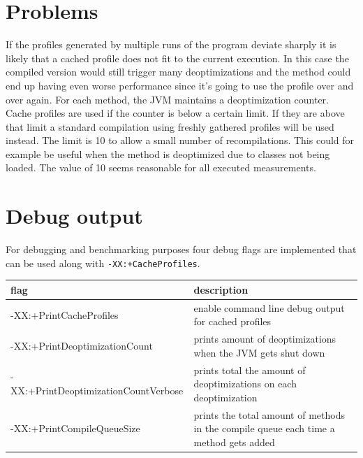 \section{Problems}
\label{s:problems}
If the profiles generated by multiple runs of the program deviate sharply it is likely that a cached profile does not fit to the current execution. In this case the compiled version would still trigger many deoptimizations and the method could end up having even worse performance since it's going to use the profile over and over again.
For each method, the JVM maintains a deoptimization counter. Cache profiles are used if the counter is below a certain limit. If they are above that limit a standard compilation using freshly gathered profiles will be used instead.
The limit is 10 to allow a small number of recompilations. This could for example be useful when the method is deoptimized due to classes not being loaded. The value of 10 seems reasonable for all executed measurements.
\section{Debug output}
\label{s:debugoutput}
For debugging and benchmarking purposes four debug flags are implemented that can be used along with \texttt{-XX:+CacheProfiles}.
\begin{table}[ht]
  \centering
  \label{t:debugflags}
  \begin{center}
    \begin{tabular}{| l | p{9.0cm} |}
       \hline
       \textbf{flag} & \textbf{description} \\ \hline\hline
       -XX:+PrintCacheProfiles & enable command line debug output for cached profiles\\ \hline
       -XX:+PrintDeoptimizationCount & prints amount of deoptimizations when the JVM gets shut down\\ \hline
       -XX:+PrintDeoptimizationCountVerbose & prints total the amount of deoptimizations on each deoptimization\\ \hline
       -XX:+PrintCompileQueueSize & prints the total amount of methods in the compile queue each time a method gets added \\ \hline
    \end{tabular}
  \end{center}
\end{table}

 
